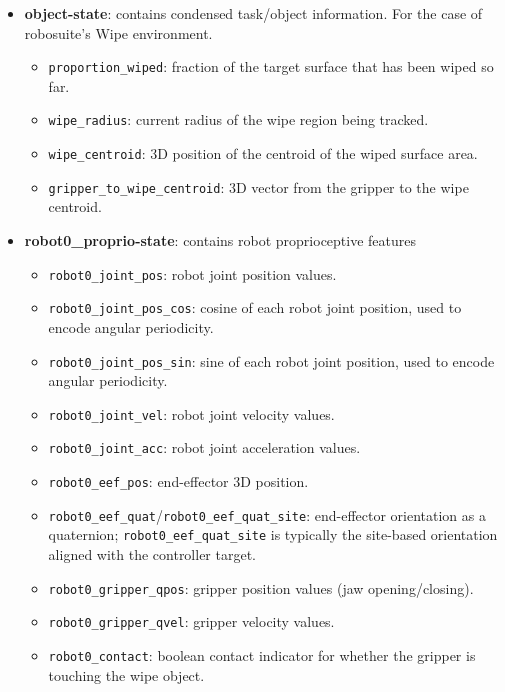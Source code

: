 \documentclass[letterpaper, 10 pt, conference]{IEEEtran}
\begin{document}
\begin{itemize}
    \item \textbf{object-state}: contains condensed task/object information. For the case of robosuite's Wipe environment.
    \begin{itemize}
        \item \texttt{proportion\_wiped}: fraction of the target surface that has been wiped so far.
        \item \texttt{wipe\_radius}: current radius of the wipe region being tracked.
        \item \texttt{wipe\_centroid}: 3D position of the centroid of the wiped surface area.
        \item \texttt{gripper\_to\_wipe\_centroid}: 3D vector from the gripper to the wipe centroid.
    \end{itemize}

    \item \textbf{robot0\_proprio-state}: contains robot proprioceptive features
    \begin{itemize}
        \item \texttt{robot0\_joint\_pos}: robot joint position values.
        \item \texttt{robot0\_joint\_pos\_cos}: cosine of each robot joint position, used to encode angular periodicity.
        \item \texttt{robot0\_joint\_pos\_sin}: sine of each robot joint position, used to encode angular periodicity.
        \item \texttt{robot0\_joint\_vel}: robot joint velocity values.
        \item \texttt{robot0\_joint\_acc}: robot joint acceleration values.
        \item \texttt{robot0\_eef\_pos}: end-effector 3D position.
        \item \texttt{robot0\_eef\_quat}/\texttt{robot0\_eef\_quat\_site}: end-effector orientation as a quaternion; \texttt{robot0\_eef\_quat\_site} is typically the site-based orientation aligned with the controller target.
        \item \texttt{robot0\_gripper\_qpos}: gripper position values (jaw opening/closing).
        \item \texttt{robot0\_gripper\_qvel}: gripper velocity values.
        \item \texttt{robot0\_contact}: boolean contact indicator for whether the gripper is touching the wipe object.
    \end{itemize}
\end{itemize}
\end{document}
